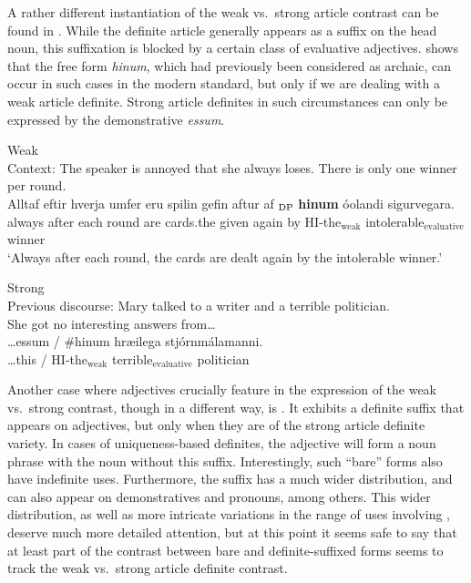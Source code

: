 \documentclass[output=paper
,modfonts
,nonflat]{langscibook}
\begin{document}
A rather different instantiation of the weak vs.\ strong article
contrast can be found in . While the definite article
generally appears as a suffix on the head noun, this suffixation is
blocked by a certain class of evaluative
adjectives. \citet{Ingason2016} shows that the free form
\textit{hinum}, which had previously been considered as archaic, can
occur in such cases in the modern standard, but only if we are dealing
with a weak article definite. Strong article definites in such
circumstances can only be expressed by the demonstrative \textit{\th
  essum}. 

\begin{exe}
\ex\label{ex:schwarz:20}   
\begin{xlist}
\ex Weak \\ Context: The speaker is annoyed that she always loses. There is
   only one winner per round. \\
\gll Alltaf eftir hverja {umfer\dh} {eru} spilin gefin aftur af {{\ob}$_\text{\textnormal{DP} }$\textbf{hinum}} {\'o\th olandi} {sigurvegara}{\cb}.  \\
 always after each  round are cards.the given again by {\db}{HI-{the}$_{\text{weak}}$} {intolerable$_{\text{evaluative}}$} winner \\
\glt `Always after each round, the cards are dealt again by the intolerable winner.'
   
\ex Strong\\ 
Previous discourse: Mary talked to a writer and a {terrible} politician.\\
  She got no interesting answers from\ldots \\\largerpage[2]
  \gll \ldots \th essum / \#{hinum} {hr\ae \dh ilega} stj\'ornm\'alamanni.\\
 \ldots this / \phantom{\#}HI-{the}$_\text{weak}$ terrible$_\text{evaluative}$ politician \\

\end{xlist}
\end{exe}

Another case where adjectives crucially feature in the expression
of the weak vs.\ strong contrast, though in a different way, is
 \citep{SereikaiteToAppear}. It exhibits a definite suffix that
appears on adjectives, but only when they are of the strong article
definite variety. In cases of uniqueness-based definites, the
adjective will form a noun phrase with the noun without this
suffix. Interestingly, such ``bare'' forms also have indefinite
uses. Furthermore, the suffix has a much wider distribution, and can
also appear on demonstratives and pronouns, among others. This wider
distribution, as well as more intricate variations in the range of
uses involving , deserve much more detailed attention,
but at this point it seems safe to say that at least part of the
contrast between bare and definite-suffixed forms seems to track the
weak vs.\ strong article definite contrast. 
\end{document}
